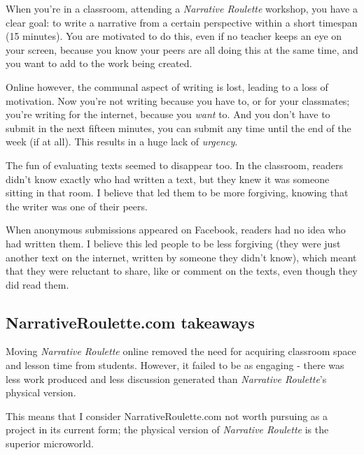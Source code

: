 When you're in a classroom, attending a \emph{Narrative Roulette}
workshop, you have a clear goal: to write a narrative from a certain
perspective within a short timespan (15 minutes). You are motivated to
do this, even if no teacher keeps an eye on your screen, because you
know your peers are all doing this at the same time, and you want to add
to the work being created.

Online however, the communal aspect of writing is lost, leading to a loss of motivation. Now you're not writing because you have
to, or for your classmates; you're writing for the internet, because you
\emph{want} to. And you don't have to submit in the next fifteen
minutes, you can submit any time until the end of the week (if at all). This results in a huge lack of \emph{urgency}. 

The fun of evaluating texts seemed to disappear too. In the classroom,
readers didn't know exactly who had written a text, but they knew it was
someone sitting in that room. I believe that led them to be more
forgiving, knowing that the writer was one of their peers.

When anonymous submissions appeared on Facebook, readers had no idea
who had written them. I believe this led people to be less forgiving (they were just another text on the internet, written by someone they didn't know), which
meant that they were reluctant to share, like or comment on the texts, even though they did read them.

\subsection{NarrativeRoulette.com takeaways}

Moving \emph{Narrative Roulette} online removed the need for acquiring
classroom space and lesson time from students. However, it failed to be
as engaging - there was less work produced and less discussion generated
than \emph{Narrative Roulette}'s physical version.

This means that I consider NarrativeRoulette.com not worth pursuing as a
project in its current form; the physical version of \emph{Narrative
Roulette} is the superior microworld.
